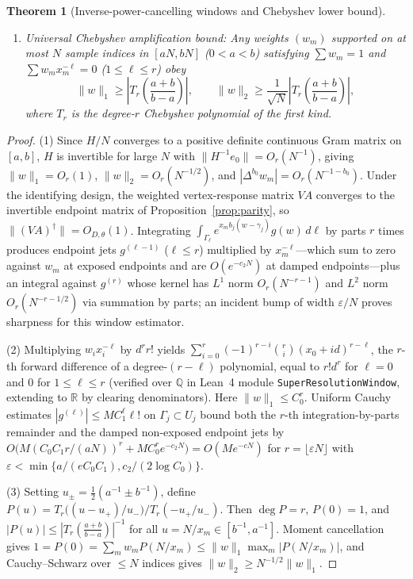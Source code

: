 \documentclass[11pt,reqno]{amsart}
\newtheorem{theorem}{Theorem}[section]
\theoremstyle{definition}
\theoremstyle{remark}
\newcommand{\R}{\mathbb{R}}
\begin{document}
\begin{theorem}[Inverse-power-cancelling windows and Chebyshev lower bound]
\begin{enumerate}
  \item \emph{Universal Chebyshev amplification bound}: Any weights $(w_m)$ supported on at most $N$ sample indices in $[a N, b N]$ ($0 < a < b$) satisfying $\sum w_m = 1$ and $\sum w_m x_m^{-\ell} = 0$ ($1 \le \ell \le r$) obey
  \begin{equation}\label{eq:chebyshev}
    \|w\|_1 \ge \left|T_r\!\left(\frac{a+b}{b-a}\right)\right|, \qquad
    \|w\|_2 \ge \frac{1}{\sqrt{N}}\left|T_r\!\left(\frac{a+b}{b-a}\right)\right|,
  \end{equation}
  where $T_r$ is the degree-$r$ Chebyshev polynomial of the first kind.
\end{enumerate}
\end{theorem}

\begin{proof}
(1) Since $H/N$ converges to a positive definite continuous Gram matrix on $[a,b]$, $H$ is invertible for large $N$ with $\|H^{-1}e_0\| = O_r(N^{-1})$, giving $\|w\|_1 = O_r(1)$, $\|w\|_2 = O_r(N^{-1/2})$, and $|\Delta^{b_0} w_m| = O_r(N^{-1-b_0})$. Under the identifying design, the weighted vertex-response matrix $V A$ converges to the invertible endpoint matrix of Proposition~\ref{prop:parity}, so $\|(V A)^\dagger\| = O_{D,\theta}(1)$. Integrating $\int_{\Gamma_\ell} e^{x_m b_j(w-\gamma_j)} g(w)\,d\ell$ by parts $r$ times produces endpoint jets $g^{(\ell-1)}$ ($\ell \le r$) multiplied by $x_m^{-\ell}$---which sum to zero against $w_m$ at exposed endpoints and are $O(e^{-c_2 N})$ at damped endpoints---plus an integral against $g^{(r)}$ whose kernel has $L^1$ norm $O_r(N^{-r-1})$ and $L^2$ norm $O_r(N^{-r-1/2})$ via summation by parts; an incident bump of width $\varepsilon/N$ proves sharpness for this window estimator.

(2) Multiplying $w_i x_i^{-\ell}$ by $d^r r!$ yields $\sum_{i=0}^r (-1)^{r-i} \binom{r}{i} (x_0 + i d)^{r-\ell}$, the $r$-th forward difference of a degree-$(r-\ell)$ polynomial, equal to $r! d^r$ for $\ell = 0$ and $0$ for $1 \le \ell \le r$ (verified over $\mathbb{Q}$ in Lean~4 module \texttt{SuperResolutionWindow}, extending to $\R$ by clearing denominators). Here $\|w\|_1 \le C_0^r$. Uniform Cauchy estimates $|g^{(\ell)}| \le M C_1^\ell \ell!$ on $\Gamma_j \subset U_j$ bound both the $r$-th integration-by-parts remainder and the damped non-exposed endpoint jets by $O\bigl(M (C_0 C_1 r/(aN))^r + M C_0^r e^{-c_2 N}\bigr) = O(M e^{-cN})$ for $r = \lfloor \varepsilon N \rfloor$ with $\varepsilon < \min\{a/(e C_0 C_1), c_2/(2\log C_0)\}$.

(3) Setting $u_\pm = \frac12(a^{-1} \pm b^{-1})$, define $P(u) = T_r\bigl((u - u_+)/u_-\bigr) / T_r(-u_+/u_-)$. Then $\deg P = r$, $P(0) = 1$, and $|P(u)| \le |T_r(\frac{a+b}{b-a})|^{-1}$ for all $u = N/x_m \in [b^{-1}, a^{-1}]$. Moment cancellation gives $1 = P(0) = \sum_m w_m P(N/x_m) \le \|w\|_1 \max_m |P(N/x_m)|$, and Cauchy--Schwarz over $\le N$ indices gives $\|w\|_2 \ge N^{-1/2}\|w\|_1$.
\end{proof}
\end{document}
